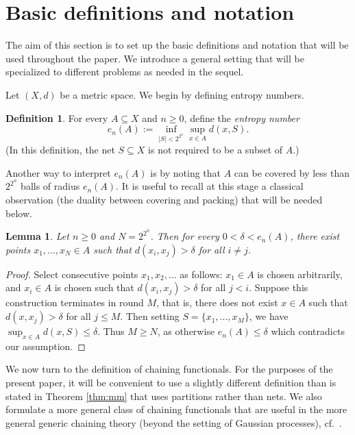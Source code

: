 \documentclass[10pt,reqno]{amsart}
\newtheorem{lem}[thm]{Lemma}
\theoremstyle{definition}
\newtheorem{defn}[thm]{Definition}
\numberwithin{equation}{section}
\numberwithin{figure}{section}
\numberwithin{table}{section}
\begin{document}
\section{Basic definitions and notation}
\label{sec:defn}

The aim of this section is to set up the basic definitions and notation 
that will be used throughout the paper. We introduce a general setting 
that will be specialized to different problems as needed in the sequel.

Let $(X,d)$ be a metric space. We begin by defining entropy numbers.

\begin{defn}
For every $A\subseteq X$ and $n\ge 0$, define the \emph{entropy number}
$$
	e_n(A) := \inf_{|S|<2^{2^n}}\sup_{x\in A} d(x,S).
$$
(In this definition, the net $S\subseteq X$ is not required to be a subset 
of $A$.)
\end{defn}

Another way to interpret $e_n(A)$ is by noting that $A$ can be covered by 
less than $2^{2^n}$ balls of radius $e_n(A)$. It is useful to recall at 
this stage a classical observation (the duality between covering 
and packing) that will be needed below.

\begin{lem}
\label{lem:packing}
Let $n\ge 0$ and $N=2^{2^n}$. Then for every 
$0<\delta<e_n(A)$, there exist points $x_1,\ldots,x_{N}\in A$ such 
that $d(x_i,x_j)>\delta$ for all $i\ne j$.
\end{lem}

\begin{proof}
Select consecutive points $x_1,x_2,\ldots$ as follows: $x_1\in A$ is 
chosen arbitrarily, and $x_i\in A$ is chosen such that 
$d(x_i,x_j)>\delta$ for all $j<i$. Suppose this construction terminates in 
round $M$, that is, there does not exist $x\in A$ such that 
$d(x,x_j)>\delta$ for all $j\le M$. Then setting $S=\{x_1,\ldots,x_M\}$, 
we have $\sup_{x\in A}d(x,S)\le\delta$. Thus $M\ge N$, as otherwise 
$e_n(A)\le\delta$ which contradicts our assumption.
\end{proof}

We now turn to the definition of chaining functionals. For the purposes of 
the present paper, it will be convenient to use a slightly different 
definition than is stated in Theorem \ref{thm:mm} that uses partitions 
rather than nets. We also formulate a more general class of chaining 
functionals that are useful in the more general generic chaining theory 
(beyond the setting of Gaussian processes), cf.\ \cite{Tal14}.
\end{document}
